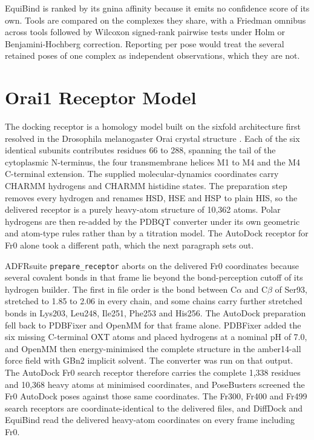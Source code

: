 EquiBind is ranked by its gnina affinity because it emits no confidence score of its own. Tools are compared on the complexes they share, with a Friedman omnibus across tools followed by Wilcoxon signed-rank pairwise tests under Holm or Benjamini-Hochberg correction. Reporting per pose would treat the several retained poses of one complex as independent observations, which they are not.

\hypertarget{orai1-receptor-model}{%
\chapter{Orai1 Receptor Model}\label{orai1-receptor-model}}

The docking receptor is a homology model built on the sixfold architecture first resolved in the Drosophila melanogaster Orai crystal structure \cite{ref037}. Each of the six identical subunits contributes residues 66 to 288, spanning the tail of the cytoplasmic N-terminus, the four transmembrane helices M1 to M4 and the M4 C-terminal extension. The supplied molecular-dynamics coordinates carry CHARMM hydrogens and CHARMM histidine states. The preparation step removes every hydrogen and renames HSD, HSE and HSP to plain HIS, so the delivered receptor is a purely heavy-atom structure of 10,362 atoms. Polar hydrogens are then re-added by the PDBQT converter under its own geometric and atom-type rules rather than by a titration model. The AutoDock receptor for Fr0 alone took a different path, which the next paragraph sets out.

ADFRsuite \texttt{prepare\_receptor} aborts on the delivered Fr0 coordinates because several covalent bonds in that frame lie beyond the bond-perception cutoff of its hydrogen builder. The first in file order is the bond between C\ensuremath{\alpha} and C\ensuremath{\beta} of Ser93, stretched to 1.85 to 2.06\angstrom{} in every chain, and some chains carry further stretched bonds in Lys203, Leu248, Ile251, Phe253 and His256. The AutoDock preparation fell back to PDBFixer and OpenMM for that frame alone. PDBFixer added the six missing C-terminal OXT atoms and placed hydrogens at a nominal pH of 7.0, and OpenMM then energy-minimised the complete structure in the amber14-all force field with GBn2 implicit solvent. The converter was run on that output. The AutoDock Fr0 search receptor therefore carries the complete 1,338 residues and 10,368 heavy atoms at minimised coordinates, and PoseBusters screened the Fr0 AutoDock poses against those same coordinates. The Fr300, Fr400 and Fr499 search receptors are coordinate-identical to the delivered files, and DiffDock and EquiBind read the delivered heavy-atom coordinates on every frame including Fr0.

